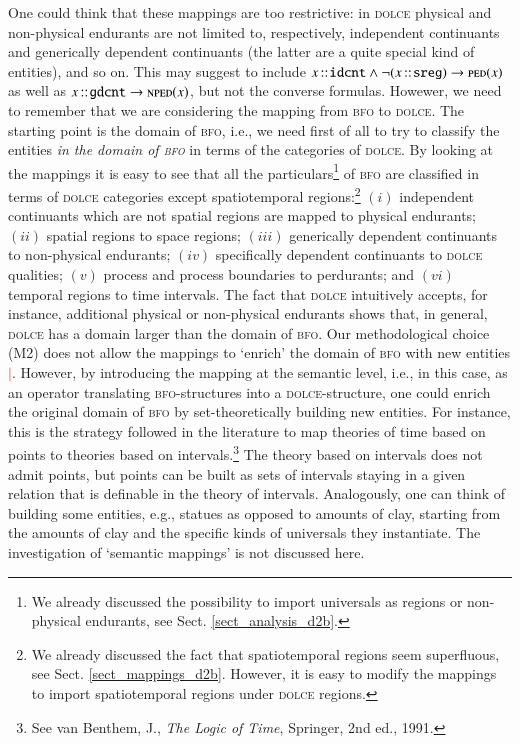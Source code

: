 \documentclass[ao]{iosart2x}
\newcommand{\nb}[1]{\textcolor{red}{$|$}\marginpar{\hspace*{-0cm}\parbox{20mm}{\scriptsize\raggedright\textcolor{red}{#1}}}}
\newcommand{\cn}[1]{\mathtt{#1}}
\newcommand{\dolce}{{\textsc{dolce}}}
\newcommand{\bfo}{{\textsc{bfo}}}
\newcommand {\NPEDdcat} {\textsc{nped}}
\newcommand {\PEDdcat} {\textsc{ped}}
\newcommand{\idcntbcat}{\cn{idcnt}}
\newcommand{\gdcntbcat}{\cn{gdcnt}}
\newcommand{\sregbcat}{\cn{sreg}}
\newcommand{\bfoiof}[1]{{\,::_{#1\:\!}}}
\begin{document}
One could think that these mappings are too restrictive: in {\dolce} physical and non-physical endurants are not limited to, respectively, independent continuants and generically dependent continuants (the latter are a quite special kind of entities), and so on. This may suggest to include  $x \bfoiof{} \idcntbcat \land \neg(x \bfoiof{} \sregbcat) \to \PEDdcat(x)$ as well as $x \bfoiof{} \gdcntbcat \to \NPEDdcat(x)$, but not the converse formulas. Howewer, we need to remember that we are considering the mapping from {\bfo} to {\dolce}. The starting point is the domain of {\bfo}, i.e., we need first of all to try to classify the entities \emph{in the domain of {\bfo}} in terms of the categories of {\dolce}. By looking at the mappings it is easy to see that all the particulars\footnote{We already discussed the possibility to import universals as regions or non-physical endurants, see Sect. \ref{sect_analysis_d2b}.} of {\bfo} are classified in terms of {\dolce} categories except spatiotemporal regions:\footnote{We already discussed the fact that spatiotemporal regions seem superfluous, see Sect. \ref{sect_mappings_d2b}. However, it is easy to modify the mappings to import spatiotemporal regions under {\dolce} regions.} $(i)$ independent continuants which are not spatial regions are mapped to physical endurants; $(ii)$ spatial regions to space regions; $(iii)$ generically dependent continuants to non-physical endurants; $(iv)$ specifically dependent continuants to {\dolce} qualities; $(v)$ process and process boundaries to perdurants; and $(vi)$ temporal regions to time intervals. The fact that {\dolce} intuitively accepts, for instance, additional physical or non-physical endurants shows that, in general, {\dolce} has a domain larger than the domain of {\bfo}. Our methodological choice (M2) does not allow the mappings to `enrich' the domain of {\bfo} with new entities\nb{FC: non chiaro perché lo proibisce, forse M3? Ma non chiaro comunque}.  However, by introducing the mapping at the semantic level, i.e., in this case, as an operator translating {\bfo}-structures into a {\dolce}-structure, one could enrich the original domain of {\bfo} by set-theoretically building new entities. For instance, this is the strategy followed in the literature to map theories of time based on points to theories based on intervals.\footnote{See van Benthem, J., \emph{The Logic of Time}, Springer, 2nd ed., 1991.} The theory based on intervals does not admit points, but points can be built as sets of intervals staying in a given relation that is definable in the theory of intervals.  Analogously, one can think of building some entities, e.g., statues as opposed to amounts of clay, starting from the amounts of clay and the specific kinds of universals they instantiate. The investigation of `semantic mappings' is not discussed here. 
\end{document}
